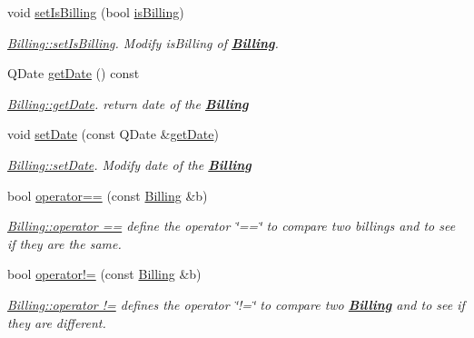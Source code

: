 \begin{DoxyCompactItemize}
void \hyperlink{classModels_1_1Billing_aff8b71426c02bc97f0a724ef762cd42e}{set\-Is\-Billing} (bool \hyperlink{classModels_1_1Billing_ab03dd29a9812a995355a1d93318f348f}{is\-Billing})
\begin{DoxyCompactList}\small\item\em \hyperlink{classModels_1_1Billing_aff8b71426c02bc97f0a724ef762cd42e}{Billing\-::set\-Is\-Billing}. Modify {\itshape is\-Billing} of {\bfseries \hyperlink{classModels_1_1Billing}{Billing}}. \end{DoxyCompactList}\item 
Q\-Date \hyperlink{classModels_1_1Billing_af0d1f0132d0902fb96456d0a9018b701}{get\-Date} () const 
\begin{DoxyCompactList}\small\item\em \hyperlink{classModels_1_1Billing_af0d1f0132d0902fb96456d0a9018b701}{Billing\-::get\-Date}. return date of the {\bfseries \hyperlink{classModels_1_1Billing}{Billing}} \end{DoxyCompactList}\item 
void \hyperlink{classModels_1_1Billing_ae8db0fe5fe273fad31e2f846b5b891cb}{set\-Date} (const Q\-Date \&\hyperlink{classModels_1_1Billing_af0d1f0132d0902fb96456d0a9018b701}{get\-Date})
\begin{DoxyCompactList}\small\item\em \hyperlink{classModels_1_1Billing_ae8db0fe5fe273fad31e2f846b5b891cb}{Billing\-::set\-Date}. Modify {\itshape date} of the {\bfseries \hyperlink{classModels_1_1Billing}{Billing}} \end{DoxyCompactList}\item 
bool \hyperlink{classModels_1_1Billing_af3d8818a1e00eaa707058567fccf045b}{operator==} (const \hyperlink{classModels_1_1Billing}{Billing} \&b)
\begin{DoxyCompactList}\small\item\em \hyperlink{classModels_1_1Billing_af3d8818a1e00eaa707058567fccf045b}{Billing\-::operator ==} define the operator \char`\"{}==\char`\"{} to compare two billings and to see if they are the same. \end{DoxyCompactList}\item 
bool \hyperlink{classModels_1_1Billing_ae6ff88e05384718d57be1be38f250a52}{operator!=} (const \hyperlink{classModels_1_1Billing}{Billing} \&b)
\begin{DoxyCompactList}\small\item\em \hyperlink{classModels_1_1Billing_ae6ff88e05384718d57be1be38f250a52}{Billing\-::operator !=} defines the operator \char`\"{}!=\char`\"{} to compare two {\bfseries \hyperlink{classModels_1_1Billing}{Billing}} and to see if they are different. \end{DoxyCompactList}\item 

\end{DoxyCompactItemize}
